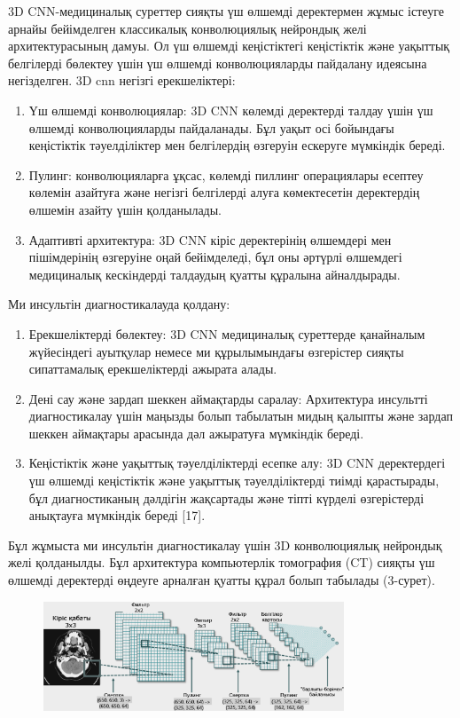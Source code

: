 3D CNN-медициналық суреттер сияқты үш өлшемді деректермен жұмыс істеуге
арнайы бейімделген классикалық конволюциялық нейрондық желі
архитектурасының дамуы. Ол үш өлшемді кеңістіктегі кеңістіктік және
уақыттық белгілерді бөлектеу үшін үш өлшемді конволюцияларды пайдалану
идеясына негізделген. 3D cnn негізгі ерекшеліктері:

\begin{enumerate}
\def\labelenumi{\arabic{enumi}.}
\item
  Үш өлшемді конволюциялар: 3D CNN көлемді деректерді талдау үшін үш
  өлшемді конволюцияларды пайдаланады. Бұл уақыт осі бойындағы
  кеңістіктік тәуелділіктер мен белгілердің өзгеруін ескеруге мүмкіндік
  береді.
\item
  Пулинг: конволюцияларға ұқсас, көлемді пиллинг операциялары есептеу
  көлемін азайтуға және негізгі белгілерді алуға көмектесетін
  деректердің өлшемін азайту үшін қолданылады.
\item
  Адаптивті архитектура: 3D CNN кіріс деректерінің өлшемдері мен
  пішімдерінің өзгеруіне оңай бейімделеді, бұл оны әртүрлі өлшемдегі
  медициналық кескіндерді талдаудың қуатты құралына айналдырады.
\end{enumerate}

Ми инсультін диагностикалауда қолдану:

\begin{enumerate}
\def\labelenumi{\arabic{enumi}.}
\item
  Ерекшеліктерді бөлектеу: 3D CNN медициналық суреттерде қанайналым
  жүйесіндегі ауытқулар немесе ми құрылымындағы өзгерістер сияқты
  сипаттамалық ерекшеліктерді ажырата алады.
\item
  Дені сау және зардап шеккен аймақтарды саралау: Архитектура инсультті
  диагностикалау үшін маңызды болып табылатын мидың қалыпты және зардап
  шеккен аймақтары арасында дәл ажыратуға мүмкіндік береді.
\item
  Кеңістіктік және уақыттық тәуелділіктерді есепке алу: 3D CNN
  деректердегі үш өлшемді кеңістіктік және уақыттық тәуелділіктерді
  тиімді қарастырады, бұл диагностиканың дәлдігін жақсартады және тіпті
  күрделі өзгерістерді анықтауға мүмкіндік береді {[}17{]}.
\end{enumerate}

Бұл жұмыста ми инсультін диагностикалау үшін 3D конволюциялық нейрондық
желі қолданылды. Бұл архитектура компьютерлік томография (CT) сияқты үш
өлшемді деректерді өңдеуге арналған қуатты құрал болып табылады
(3-сурет).

\begin{figure}[H]
	\centering
	\includegraphics[width=0.8\textwidth]{assets/3}
	\caption*{}
\end{figure}

